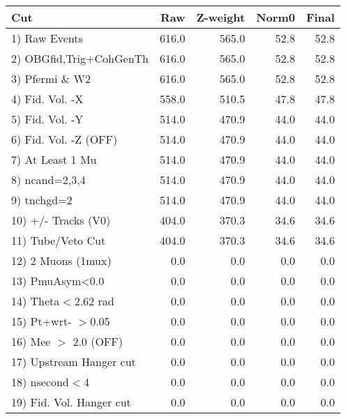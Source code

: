  \begin{table}[h!]\centering
 \begin{tabular}{||l||r|r|r|r||}
 \hline
 \hline
 Cut & Raw & Z-weight & Norm0 & Final \\
 \hline
  1) Raw Events           &       616.0 &       565.0 &        52.8 &        52.8 \\
  2) OBGfid,Trig+CohGenTh &       616.0 &       565.0 &        52.8 &        52.8 \\
  3) Pfermi \& W2         &       616.0 &       565.0 &        52.8 &        52.8 \\
  4) Fid. Vol. -X         &       558.0 &       510.5 &        47.8 &        47.8 \\
  5) Fid. Vol. -Y         &       514.0 &       470.9 &        44.0 &        44.0 \\
  6) Fid. Vol. -Z (OFF)   &       514.0 &       470.9 &        44.0 &        44.0 \\
  7) At Least 1 Mu        &       514.0 &       470.9 &        44.0 &        44.0 \\
  8) ncand=2,3,4          &       514.0 &       470.9 &        44.0 &        44.0 \\
  9) tnchgd=2             &       514.0 &       470.9 &        44.0 &        44.0 \\
 10) +/- Tracks (V0)      &       404.0 &       370.3 &        34.6 &        34.6 \\
 11) Tube/Veto Cut        &       404.0 &       370.3 &        34.6 &        34.6 \\
 12) 2 Muons (1mux)       &         0.0 &         0.0 &         0.0 &         0.0 \\
 13) PmuAsym<0.0          &         0.0 &         0.0 &         0.0 &         0.0 \\
 14) Theta$<$2.62 rad     &         0.0 &         0.0 &         0.0 &         0.0 \\
 15) Pt+wrt- $>$0.05      &         0.0 &         0.0 &         0.0 &         0.0 \\
 16) Mee $>$ 2.0  (OFF)   &         0.0 &         0.0 &         0.0 &         0.0 \\
 17) Upstream Hanger cut  &         0.0 &         0.0 &         0.0 &         0.0 \\
 18) nsecond$<$4          &         0.0 &         0.0 &         0.0 &         0.0 \\
 19) Fid. Vol. Hanger cut &         0.0 &         0.0 &         0.0 &         0.0 \\

\end{tabular}
\end{table}
